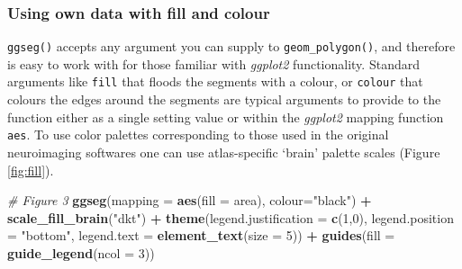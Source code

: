 \documentclass[fleqn,10pt]{wlpeerj} %
\newenvironment{Shaded}{\begin{snugshade}}{\end{snugshade}}
\newcommand{\CommentTok}[1]{\textcolor[rgb]{0.56,0.35,0.01}{\textit{#1}}}
\newcommand{\DataTypeTok}[1]{\textcolor[rgb]{0.13,0.29,0.53}{#1}}
\newcommand{\DecValTok}[1]{\textcolor[rgb]{0.00,0.00,0.81}{#1}}
\newcommand{\KeywordTok}[1]{\textcolor[rgb]{0.13,0.29,0.53}{\textbf{#1}}}
\newcommand{\NormalTok}[1]{#1}
\newcommand{\OperatorTok}[1]{\textcolor[rgb]{0.81,0.36,0.00}{\textbf{#1}}}
\newcommand{\StringTok}[1]{\textcolor[rgb]{0.31,0.60,0.02}{#1}}
\begin{document}
\hypertarget{using-own-data-with-fill-and-colour}{%
\subsubsection{Using own data with fill and colour}\label{using-own-data-with-fill-and-colour}}

\texttt{ggseg()} accepts any argument you can supply to \texttt{geom\_polygon()}, and therefore is easy to work with for those familiar with \emph{ggplot2} functionality.
Standard arguments like \texttt{fill} that floods the segments with a colour, or \texttt{colour} that colours the edges around the segments are typical arguments to provide to the function either as a single setting value or within the \emph{ggplot2} mapping function \texttt{aes}.
To use color palettes corresponding to those used in the original neuroimaging softwares one can use atlas-specific `brain' palette scales (Figure \ref{fig:fill}).

\begin{Shaded}
\begin{Highlighting}[]
\CommentTok{\# Figure 3}
\KeywordTok{ggseg}\NormalTok{(}\DataTypeTok{mapping =} \KeywordTok{aes}\NormalTok{(}\DataTypeTok{fill =}\NormalTok{ area), }\DataTypeTok{colour=}\StringTok{"black"}\NormalTok{) }\OperatorTok{+}
\StringTok{  }\KeywordTok{scale\_fill\_brain}\NormalTok{(}\StringTok{"dkt"}\NormalTok{) }\OperatorTok{+}
\StringTok{  }\KeywordTok{theme}\NormalTok{(}\DataTypeTok{legend.justification =} \KeywordTok{c}\NormalTok{(}\DecValTok{1}\NormalTok{,}\DecValTok{0}\NormalTok{),}
        \DataTypeTok{legend.position =} \StringTok{"bottom"}\NormalTok{,}
        \DataTypeTok{legend.text =} \KeywordTok{element\_text}\NormalTok{(}\DataTypeTok{size =} \DecValTok{5}\NormalTok{)) }\OperatorTok{+}
\StringTok{  }\KeywordTok{guides}\NormalTok{(}\DataTypeTok{fill =} \KeywordTok{guide\_legend}\NormalTok{(}\DataTypeTok{ncol =} \DecValTok{3}\NormalTok{))}
\end{Highlighting}
\end{Shaded}
\end{document}
